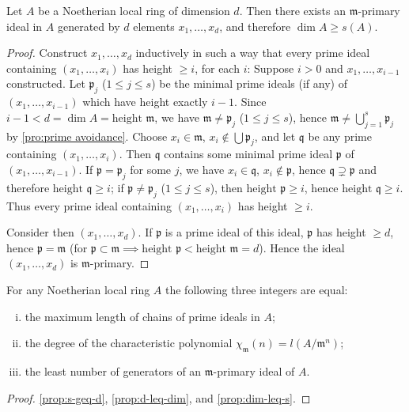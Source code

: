 \begin{proposition}\label{prop:dim-leq-s}
Let $A$ be a Noetherian local ring of dimension $d$. Then there exists an $\mathfrak{m}$-primary ideal in $A$ generated by $d$ elements $x_1, \ldots, x_d$, and therefore $\dim A \geq s(A)$.
\end{proposition}

\begin{proof}
Construct $x_1, \ldots, x_d$ inductively in such a way that every prime ideal containing $(x_1, \ldots, x_i)$ has height $\geq i$, for each $i$: Suppose $i > 0$ and $x_1, \ldots, x_{i-1}$ constructed. Let $\mathfrak{p}_j$ ($1 \leq j \leq s$) be the minimal prime ideals (if any) of $(x_1, \ldots, x_{i-1})$ which have height exactly $i - 1$. Since $i - 1 < d = \dim A = \text{height } \mathfrak{m}$, we have $\mathfrak{m} \neq \mathfrak{p}_j$ ($1 \leq j \leq s$), hence $\mathfrak{m} \neq \bigcup_{j=1}^s \mathfrak{p}_j$ by \eqref{pro:prime avoidance}. Choose $x_i \in \mathfrak{m}$, $x_i \notin \bigcup \mathfrak{p}_j$, and let $\mathfrak{q}$ be any prime containing $(x_1, \ldots, x_i)$. Then $\mathfrak{q}$ contains some minimal prime ideal $\mathfrak{p}$ of $(x_1, \ldots, x_{i-1})$. If $\mathfrak{p} = \mathfrak{p}_j$ for some $j$, we have $x_i \in \mathfrak{q}$, $x_i \notin \mathfrak{p}$, hence $\mathfrak{q} \supsetneq \mathfrak{p}$ and therefore $\text{height } \mathfrak{q} \geq i$; if $\mathfrak{p} \neq \mathfrak{p}_j$ ($1 \leq j \leq s$), then $\text{height } \mathfrak{p} \geq i$, hence $\text{height } \mathfrak{q} \geq i$. Thus every prime ideal containing $(x_1, \ldots, x_i)$ has height $\geq i$.

Consider then $(x_1, \ldots, x_d)$. If $\mathfrak{p}$ is a prime ideal of this ideal, $\mathfrak{p}$ has height $\geq d$, hence $\mathfrak{p} = \mathfrak{m}$ (for $\mathfrak{p} \subset \mathfrak{m} \implies \text{height } \mathfrak{p} < \text{height } \mathfrak{m} = d$). Hence the ideal $(x_1, \ldots, x_d)$ is $\mathfrak{m}$-primary.
\end{proof}

\begin{theorem}\label{thm:dimension-theorem}
For any Noetherian local ring $A$ the following three integers are equal:
\begin{enumerate}[i)]
    \item the maximum length of chains of prime ideals in $A$;
    \item the degree of the characteristic polynomial $\chi_{\mathfrak{m}}(n) = l(A/\mathfrak{m}^n)$;
    \item the least number of generators of an $\mathfrak{m}$-primary ideal of $A$.
\end{enumerate}
\end{theorem}
\begin{proof}
    \eqref{prop:s-geq-d}, \eqref{prop:d-leq-dim}, and \eqref{prop:dim-leq-s}.
\end{proof}

